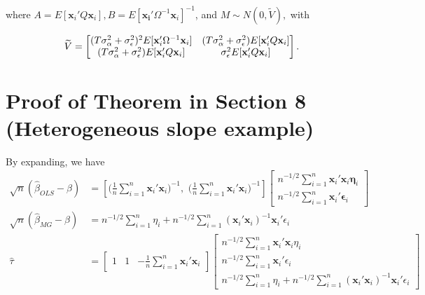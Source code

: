 \documentclass[11pt]{article}
\begin{document}
where $ A = E[\mathbf{x}_i' Q \mathbf{x}_i], B=E[\mathbf{x_i}' \Omega^{-1} \mathbf{x}_i]^{-1}$, and  $M \sim N(0, \widetilde{V}),$ with

\[
\widetilde{V} =  \begin{bmatrix}
(T\sigma_\alpha^2 + \sigma_\epsilon^2)^2 E[\mathbf{x}_i' \Omega^{-1} \mathbf{x}_i] & (T\sigma_\alpha^2 + \sigma_\epsilon^2) E[\mathbf{x}_i' Q \mathbf{x}_i] \\
 (T\sigma_\alpha^2 + \sigma_\epsilon^2) E[\mathbf{x}_i' Q \mathbf{x}_i] & \sigma_\epsilon^2 E[\mathbf{x}_i' Q \mathbf{x}_i]
\end{bmatrix}. \\
\]

\vspace{0.2in}

\section*{Proof of Theorem in Section 8 (Heterogeneous slope example)}


By expanding, we have 
\begin{align*}
\sqrt{n} (\widehat{\beta}_{OLS} - \beta) & =  \left[\bigg(\frac{1}{n}\sum_{i=1}^{n} \mathbf{x}_i'  \mathbf{x}_i\bigg)^{-1}, \,\, \bigg(\frac{1}{n}\sum_{i=1}^{n} \mathbf{x}_i'  \mathbf{x}_i\bigg)^{-1} \right] \begin{bmatrix}
n^{-1/2}\sum_{i=1}^{n} \mathbf{x}_i'\mathbf{x}_i\mathbf{\eta}_i   \\
n^{-1/2}\sum_{i=1}^{n} \mathbf{x}_i'\mathbf{\epsilon}_i   
\end{bmatrix} \\
\sqrt{n} (\widehat{\beta}_{MG} - \beta)  &= n^{-1/2} \sum_{i=1}^n \eta_i + n^{-1/2} \sum_{i=1}^n (\mathbf{x}_i'\mathbf{x}_i)^{-1} \mathbf{x}_i'\epsilon_i \\
\widehat{\tau}  &=  \begin{bmatrix}
1 & 1& -\frac{1}{n}\sum_{i=1}^n \mathbf{x}_i'\mathbf{x}_i
\end{bmatrix} \begin{bmatrix}
n^{-1/2} \sum_{i=1}^n \mathbf{x}_i'\mathbf{x}_i \eta_i \\
n^{-1/2} \sum_{i=1}^n \mathbf{x}_i'\epsilon_i\\
n^{-1/2} \sum_{i=1}^n \eta_i + n^{-1/2} \sum_{i=1}^n (\mathbf{x}_i'\mathbf{x}_i)^{-1} \mathbf{x}_i'\epsilon_i 
\end{bmatrix}
\end{align*}
\end{document}

